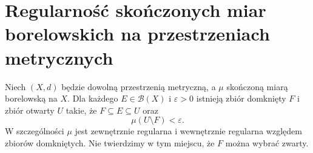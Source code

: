 \section{Regularność skończonych miar borelowskich na przestrzeniach metrycznych}
\begin{twierdzenie}
\label{thm:finite-metric-regular-20}
Niech $(X,d)$ będzie dowolną przestrzenią metryczną,
a $\mu$ skończoną miarą borelowską na $X$.
Dla każdego $E\in\mathcal B(X)$ i $\varepsilon>0$
istnieją zbiór domknięty $F$ i zbiór otwarty $U$ takie,
że $F\subseteq E\subseteq U$ oraz
\begin{equation}\label{eq:finite-regular-error-20}
 \mu(U\setminus F)<\varepsilon.
\end{equation}
W szczególności $\mu$ jest zewnętrznie regularna
i wewnętrznie regularna względem zbiorów domkniętych.
Nie twierdzimy w tym miejscu, że $F$ można wybrać zwarty.
\end{twierdzenie}

